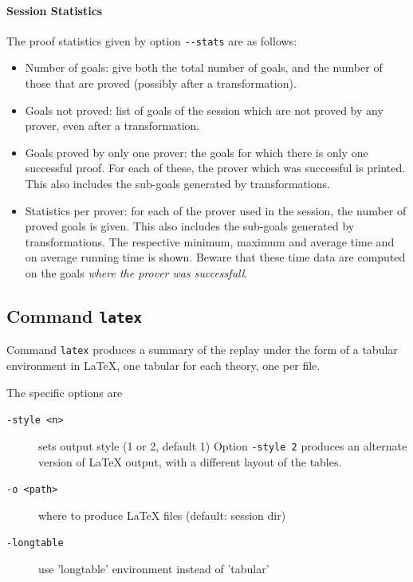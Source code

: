 
\paragraph{Session Statistics}

The proof statistics given by option \verb|--stats| are as follows:
\begin{itemize}
\item Number of goals: give both the total number of goals, and the
  number of those that are proved (possibly after a transformation).
\item Goals not proved: list of goals of the session which are not
  proved by any prover, even after a transformation.
\item Goals proved by only one prover: the goals for which there is only
  one successful proof. For each of these, the prover which was
  successful is printed. This also includes the sub-goals generated by
  transformations.
\item Statistics per prover: for each of the prover used in the
  session, the number of proved goals is given. This also includes the
  sub-goals generated by transformations. The respective minimum,
  maximum and average time and on average running time is
  shown. Beware that these time data are computed on the
  goals \emph{where the prover was successfull}.
\end{itemize}


\subsection{Command \texttt{latex}}

Command \texttt{latex} produces a summary of the replay under the form
of a tabular environment in LaTeX, one tabular for each theory, one
per file.

The specific options are
\begin{description}
\item[\texttt{-style <n>}] sets output style (1 or 2, default 1)
  Option \texttt{-style 2} produces an alternate version of LaTeX
  output, with a different layout of the tables.
\item[\texttt{-o <path>}] where
  to produce LaTeX files (default: session dir)
\item[\texttt{-longtable}] use 'longtable' environment instead of 'tabular'
\end{description}



